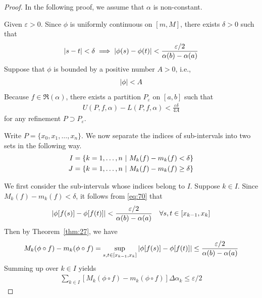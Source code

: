 \documentclass[thmcnt=section, 12pt]{my-elegantbook}
\begin{document}
\begin{proof}
    In the following proof, we assume that $\alpha$ is non-constant.

    Given $\varepsilon > 0$. Since $\phi$ is uniformly continuous on $[m, M]$, there exists $\delta > 0$ such that 
    \begin{align}
        \left\lvert s - t \right\rvert < \delta
        \implies \left\lvert \phi(s) - \phi(t) \right\rvert < \frac{\varepsilon / 2}{\alpha(b) - \alpha(a)}
        \label{eq:70}
    \end{align}
    Suppose that $\phi$ is bounded by a positive number $A > 0$, i.e., 
    \begin{align*}
        \left\lvert \phi \right\rvert < A
    \end{align*}
    Because $f \in \mathfrak{R}(\alpha)$, there exists a partition $P_\varepsilon$ on $[a, b]$ such that 
    \begin{align}
        U(P,f,\alpha) - L(P,f,\alpha) < \frac{\varepsilon \delta}{4A}
        \label{eq:71}
    \end{align}
    for any refinement $P \supset P_\varepsilon$.

    Write $P = \{x_0,x_1, \ldots, x_n\}$. We now separate the indices of sub-intervals into two sets in the following way.
    \begin{align*}
        I &= \left\{ k=1,\ldots,n \ \middle| \ M_k(f) - m_k(f) < \delta \right\} \\ 
        J &= \left\{ k=1,\ldots,n \ \middle| \ M_k(f) - m_k(f) \geq \delta \right\}
    \end{align*}

    We first consider the sub-intervals whose indices belong to $I$. Suppose $k \in I$. Since $M_k(f) - m_k(f) < \delta$, it follows from \eqref{eq:70} that 
    \begin{align*}
        \left\lvert \phi[f(s)] - \phi[f(t)] \right\rvert
        < \frac{\varepsilon / 2}{\alpha(b) - \alpha(a)}
        \quad \forall s,t \in [x_{k-1}, x_{k}]
    \end{align*}
    Then by Theorem~\ref{thm:27}, we have 
    \begin{align*}
        M_k(\phi \circ f) - m_k(\phi \circ f)
        = \sup_{s,t \in [x_{k-1}, x_k]} \left\lvert \phi[f(s)] - \phi[f(t)] \right\rvert
        \leq \frac{\varepsilon / 2}{\alpha(b) - \alpha(a)}
    \end{align*}
    Summing up over $k \in I$ yields
    \begin{align}
        \sum_{k \in I} \left[ M_k(\phi \circ f) - m_k(\phi \circ f) \right] \Delta \alpha_k
        \leq \varepsilon / 2
        \label{eq:72}
    \end{align}
    

\end{proof}
\end{document}
